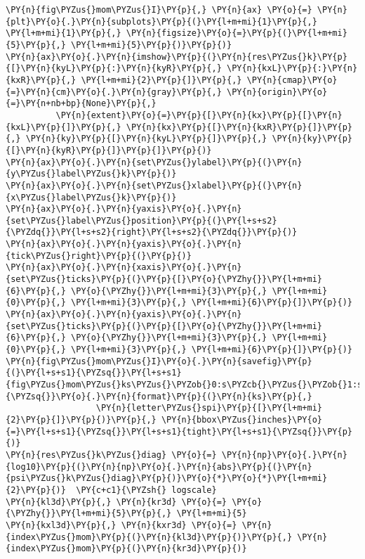 \begin{Verbatim}[commandchars=\\\{\}]
\PY{n}{fig\PYZus{}mom\PYZus{}I}\PY{p}{,} \PY{n}{ax} \PY{o}{=} \PY{n}{plt}\PY{o}{.}\PY{n}{subplots}\PY{p}{(}\PY{l+m+mi}{1}\PY{p}{,} \PY{l+m+mi}{1}\PY{p}{,} \PY{n}{figsize}\PY{o}{=}\PY{p}{(}\PY{l+m+mi}{5}\PY{p}{,} \PY{l+m+mi}{5}\PY{p}{)}\PY{p}{)}
\PY{n}{ax}\PY{o}{.}\PY{n}{imshow}\PY{p}{(}\PY{n}{res\PYZus{}k}\PY{p}{[}\PY{n}{kyL}\PY{p}{:}\PY{n}{kyR}\PY{p}{,} \PY{n}{kxL}\PY{p}{:}\PY{n}{kxR}\PY{p}{,} \PY{l+m+mi}{2}\PY{p}{]}\PY{p}{,} \PY{n}{cmap}\PY{o}{=}\PY{n}{cm}\PY{o}{.}\PY{n}{gray}\PY{p}{,} \PY{n}{origin}\PY{o}{=}\PY{n+nb+bp}{None}\PY{p}{,}
          \PY{n}{extent}\PY{o}{=}\PY{p}{[}\PY{n}{kx}\PY{p}{[}\PY{n}{kxL}\PY{p}{]}\PY{p}{,} \PY{n}{kx}\PY{p}{[}\PY{n}{kxR}\PY{p}{]}\PY{p}{,} \PY{n}{ky}\PY{p}{[}\PY{n}{kyL}\PY{p}{]}\PY{p}{,} \PY{n}{ky}\PY{p}{[}\PY{n}{kyR}\PY{p}{]}\PY{p}{]}\PY{p}{)}
\PY{n}{ax}\PY{o}{.}\PY{n}{set\PYZus{}ylabel}\PY{p}{(}\PY{n}{y\PYZus{}label\PYZus{}k}\PY{p}{)}
\PY{n}{ax}\PY{o}{.}\PY{n}{set\PYZus{}xlabel}\PY{p}{(}\PY{n}{x\PYZus{}label\PYZus{}k}\PY{p}{)}
\PY{n}{ax}\PY{o}{.}\PY{n}{yaxis}\PY{o}{.}\PY{n}{set\PYZus{}label\PYZus{}position}\PY{p}{(}\PY{l+s+s2}{\PYZdq{}}\PY{l+s+s2}{right}\PY{l+s+s2}{\PYZdq{}}\PY{p}{)}
\PY{n}{ax}\PY{o}{.}\PY{n}{yaxis}\PY{o}{.}\PY{n}{tick\PYZus{}right}\PY{p}{(}\PY{p}{)}
\PY{n}{ax}\PY{o}{.}\PY{n}{xaxis}\PY{o}{.}\PY{n}{set\PYZus{}ticks}\PY{p}{(}\PY{p}{[}\PY{o}{\PYZhy{}}\PY{l+m+mi}{6}\PY{p}{,} \PY{o}{\PYZhy{}}\PY{l+m+mi}{3}\PY{p}{,} \PY{l+m+mi}{0}\PY{p}{,} \PY{l+m+mi}{3}\PY{p}{,} \PY{l+m+mi}{6}\PY{p}{]}\PY{p}{)}
\PY{n}{ax}\PY{o}{.}\PY{n}{yaxis}\PY{o}{.}\PY{n}{set\PYZus{}ticks}\PY{p}{(}\PY{p}{[}\PY{o}{\PYZhy{}}\PY{l+m+mi}{6}\PY{p}{,} \PY{o}{\PYZhy{}}\PY{l+m+mi}{3}\PY{p}{,} \PY{l+m+mi}{0}\PY{p}{,} \PY{l+m+mi}{3}\PY{p}{,} \PY{l+m+mi}{6}\PY{p}{]}\PY{p}{)}
\PY{n}{fig\PYZus{}mom\PYZus{}I}\PY{o}{.}\PY{n}{savefig}\PY{p}{(}\PY{l+s+s1}{\PYZsq{}}\PY{l+s+s1}{fig\PYZus{}mom\PYZus{}ks\PYZus{}\PYZob{}0:s\PYZcb{}\PYZus{}\PYZob{}1:s\PYZcb{}}\PY{l+s+s1}{\PYZsq{}}\PY{o}{.}\PY{n}{format}\PY{p}{(}\PY{n}{ks}\PY{p}{,}
                  \PY{n}{letter\PYZus{}spi}\PY{p}{[}\PY{l+m+mi}{2}\PY{p}{]}\PY{p}{)}\PY{p}{,} \PY{n}{bbox\PYZus{}inches}\PY{o}{=}\PY{l+s+s1}{\PYZsq{}}\PY{l+s+s1}{tight}\PY{l+s+s1}{\PYZsq{}}\PY{p}{)}
\PY{n}{res\PYZus{}k\PYZus{}diag} \PY{o}{=} \PY{n}{np}\PY{o}{.}\PY{n}{log10}\PY{p}{(}\PY{n}{np}\PY{o}{.}\PY{n}{abs}\PY{p}{(}\PY{n}{psi\PYZus{}k\PYZus{}diag}\PY{p}{)}\PY{o}{*}\PY{o}{*}\PY{l+m+mi}{2}\PY{p}{)}  \PY{c+c1}{\PYZsh{} logscale}
\PY{n}{kl3d}\PY{p}{,} \PY{n}{kr3d} \PY{o}{=} \PY{o}{\PYZhy{}}\PY{l+m+mi}{5}\PY{p}{,} \PY{l+m+mi}{5}
\PY{n}{kxl3d}\PY{p}{,} \PY{n}{kxr3d} \PY{o}{=} \PY{n}{index\PYZus{}mom}\PY{p}{(}\PY{n}{kl3d}\PY{p}{)}\PY{p}{,} \PY{n}{index\PYZus{}mom}\PY{p}{(}\PY{n}{kr3d}\PY{p}{)}

\end{Verbatim}
